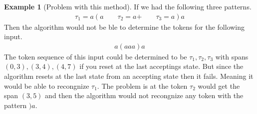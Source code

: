 \documentclass[a4paper,12pt]{article}
\theoremstyle{definition}
\newtheorem{example}{Example}[section]
\begin{document}
\begin{example}[Problem with this method]
  If we had the following three patterns.
  \begin{align*}
    \tau_1 = a(a \qquad \tau_2 = a\text{+} \qquad \tau_3 = a)a
  \end{align*}
  Then the algorithm would not be ble to determine the tokens for the following input.
  \begin{align*}
    a(aaa)a
  \end{align*}
  The token sequence of this input could be determined to be $\tau_1, \tau_2, \tau_3$ with spans $(0, 3), (3, 4), (4, 7)$ if you reset at the last acceptings state. But since the algorithm resets at the last state from an accepting state then it fails. Meaning it would be able to recongnize $\tau_1$. The problem is at the token $\tau_2$ would get the span $(3, 5)$ and then the algorithm would not recongnize any token with the pattern $)a$.
\end{example}
\end{document}
